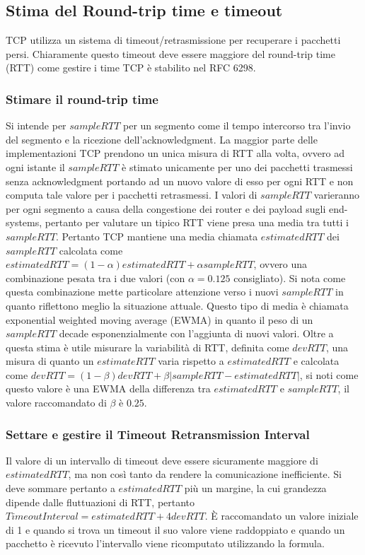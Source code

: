 \subsection{Stima del Round-trip time e timeout}
TCP utilizza un sistema di timeout/retrasmissione per recuperare i pacchetti persi. Chiaramente questo timeout deve essere maggiore del round-trip time 
(RTT) come gestire i time TCP \`e stabilito nel RFC 6298.
\subsubsection{Stimare il round-trip time}
Si intende per $sampleRTT$ per un segmento come il tempo intercorso tra l'invio del segmento e la ricezione dell'acknowledgment. La maggior parte delle 
implementazioni TCP prendono un unica misura di RTT alla volta, ovvero ad ogni istante il $sampleRTT$ \`e stimato unicamente per uno dei pacchetti trasmessi
senza acknowledgment portando ad un nuovo valore di esso per ogni RTT e non computa tale valore per i pacchetti retrasmessi. I valori di $sampleRTT$ 
varieranno per ogni segmento a causa della congestione dei router e dei payload sugli end-systems, pertanto per valutare un tipico RTT viene presa una media
tra tutti i $sampleRTT$. Pertanto TCP mantiene una media chiamata $estimatedRTT$ dei $sampleRTT$ calcolata come $estimatedRTT=(1-\alpha)estimatedRTT+\alpha
sampleRTT$, ovvero una combinazione pesata tra i due valori (con $\alpha=0.125$ consigliato). Si nota come questa combinazione mette particolare attenzione
verso i nuovi $sampleRTT$ in quanto riflettono meglio la situazione attuale. Questo tipo di media \`e chiamata exponential weighted moving average (EWMA) in
quanto il peso di un $sampleRTT$ decade esponenzialmente con l'aggiunta di nuovi valori. Oltre a questa stima \`e utile misurare la variabilit\`a di RTT, 
definita come $devRTT$, una misura di quanto un $estimateRTT$ varia rispetto a $estimatedRTT$ e calcolata come $devRTT=(1-\beta)devRTT+\beta|sampleRTT-
estimatedRTT|$, si noti come questo valore \`e una EWMA della differenza tra $estimatedRTT$ e $sampleRTT$, il valore raccomandato di $\beta$ \`e $0.25$.
\subsubsection{Settare e gestire il Timeout Retransmission Interval}
Il valore di un intervallo di timeout deve essere sicuramente maggiore di $estimatedRTT$, ma non cos\`i tanto da rendere la comunicazione inefficiente.
Si deve sommare pertanto a $estimatedRTT$ pi\`u un margine, la cui grandezza dipende dalle fluttuazioni di RTT, pertanto $TimeoutInterval=estimatedRTT+
4devRTT$. \`E raccomandato un valore iniziale di 1 e quando si trova un timeout il suo valore viene raddoppiato e quando un pacchetto \`e ricevuto 
l'intervallo viene ricomputato utilizzando la formula.
